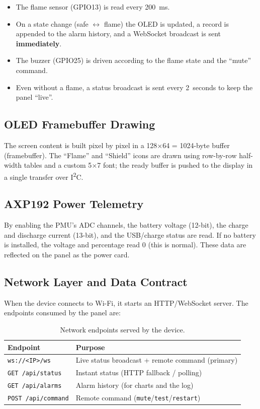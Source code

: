 \documentclass[11pt,a4paper]{article}
\begin{document}
\begin{itemize}[leftmargin=1.4em]
  \item The flame sensor (GPIO13) is read every 200~ms.
  \item On a state change (safe $\leftrightarrow$ flame) the OLED is updated, a record is
        appended to the alarm history, and a WebSocket broadcast is sent \textbf{immediately}.
  \item The buzzer (GPIO25) is driven according to the flame state and the ``mute'' command.
  \item Even without a flame, a status broadcast is sent every 2~seconds to keep the panel
        ``live''.
\end{itemize}

\subsection{OLED Framebuffer Drawing}
The screen content is built pixel by pixel in a 128$\times$64 = 1024-byte buffer
(framebuffer). The ``Flame'' and ``Shield'' icons are drawn using row-by-row half-width
tables and a custom 5$\times$7 font; the ready buffer is pushed to the display in a single
transfer over I\textsuperscript{2}C.

\subsection{AXP192 Power Telemetry}
By enabling the PMU's ADC channels, the battery voltage (12-bit), the charge and discharge
current (13-bit), and the USB/charge status are read. If no battery is installed, the
voltage and percentage read 0 (this is normal). These data are reflected on the panel as
the power card.

\subsection{Network Layer and Data Contract}
When the device connects to Wi-Fi, it starts an HTTP/WebSocket server. The endpoints
consumed by the panel are:

\begin{table}[H]
\centering
\caption{Network endpoints served by the device.}
\begin{tabular}{L{5.0cm} L{9.0cm}}
\toprule
\textbf{Endpoint} & \textbf{Purpose}\\
\midrule
\texttt{ws://<IP>/ws}         & Live status broadcast + remote command (primary)\\
\texttt{GET /api/status}      & Instant status (HTTP fallback / polling)\\
\texttt{GET /api/alarms}      & Alarm history (for charts and the log)\\
\texttt{POST /api/command}    & Remote command (\texttt{mute}/\texttt{test}/\texttt{restart})\\
\bottomrule
\end{tabular}
\end{table}
\end{document}
